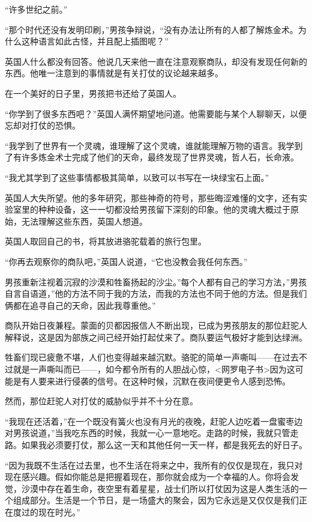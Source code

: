 \documentclass[twoside,openany]{book}
\begin{document}
“许多世纪之前。”

“那个时代还没有发明印刷，”男孩争辩说，“没有办法让所有的人都了解炼金术。为什么这种语言如此古怪，并且配上插图呢？”

英国人什么都没有回答。他说几天来他一直在注意观察商队，却没有发现任何新的东西。他唯一注意到的事情就是有关打仗的议论越来越多。

在一个美好的日子里，男孩把书还给了英国人。

“你学到了很多东西吧？”英国人满怀期望地问道。他需要能与某个人聊聊天，以便忘却对打仗的恐惧。

“我学到了世界有一个灵魂，谁理解了这个灵魂，谁就能理解万物的语言。我学到了有许多炼金术士完成了他们的天命，最终发现了世界灵魂，哲人石，长命液。

“我尤其学到了这些事情都极其简单，以致可以书写在一块绿宝石上面。”

英国人大失所望。他的多年研究，那些神奇的符号，那些晦涩难懂的文字，还有实验室里的种种设备，这一一切都没给男孩留下深刻的印象。他的灵魂大概过于原始，无法理解这些东西，英国人想道。

英国人取回自己的书，将其放进骆驼载着的旅行包里。

“你再去观察你的商队吧，”英国人说道，“它也没教会我任何东西。”

男孩重新注视着沉寂的沙漠和牲畜扬起的沙尘。”每个人都有自己的学习方法，”男孩自言自语道，”他的方法不同于我的方法，而我的方法也不同于他的方法。但是我们俩都在追寻自己的天命，因此我尊重他。”

商队开始日夜兼程。蒙面的贝都因报信人不断出现，已成为男孩朋友的那位赶驼人解释说，这是因为部族之间己经开始打起仗来了。商队要运气极好才能到达绿洲。

牲畜们现已疲惫不堪，人们也变得越来越沉默。骆驼的简单一声嘶叫——在过去不过就是一声嘶叫而已——，如今都令所有的人胆战心惊，<网罗电子书>因为这可能是有人要来进行侵袭的信号。在这种时候，沉默在夜间便更令人感到恐怖。

然而，那位赶驼人对打仗的威胁似乎并不十分在意。

“我现在还活着，”在一个既没有簧火也没有月光的夜晚，赶驼人边吃着一盘蜜枣边对男孩说道，”当我吃东西的时候，我就一心一意地吃。走路的时候，我就只管走路。如果我必须要打仗，那么这一天和其他任何一天一样，都是我死去的好日子。

“因为我既不生活在过去里，也不生活在将来之中，我所有的仅仅是现在，我只对现在感兴趣。假如你能总是把握着现在，那你就会成为一个幸福的人。你将会发觉，沙漠中存在着生命，夜空里有着星星，战士们所以打仗因为这是人类生活的一个组成部分。生活是一个节日，是一场盛大的聚会，因为它永远是又仅仅是我们正在度过的现在时光。”
\end{document}
